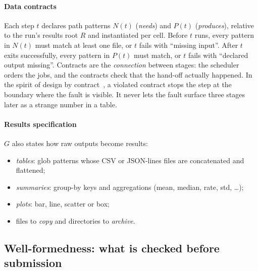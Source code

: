 \documentclass[pdflatex,sn-mathphys-num]{sn-jnl}
\theoremstyle{thmstyleone}%
\theoremstyle{thmstyletwo}%
\theoremstyle{thmstylethree}%
\begin{document}
\paragraph{Data contracts} Each step $t$ declares path patterns
$N(t)$ (\emph{needs}) and $P(t)$ (\emph{produces}), relative to the run's
results root $R$ and instantiated per cell. Before $t$ runs, every pattern in
$N(t)$ must match at least one file, or $t$ fails with ``missing input''. After
$t$ exits successfully, every pattern in $P(t)$ must match, or $t$ fails with
``declared output missing''. Contracts are the \emph{connection} between stages:
the scheduler orders the jobs, and the contracts check that the hand-off
actually happened. In the spirit of design by contract~\cite{meyer1992dbc}, a
violated contract stops the step at the boundary where the fault is visible.
It never lets the fault surface three stages later as a strange number in a
table.

\paragraph{Results specification} $G$ also states how raw outputs become
results:
\begin{itemize}[leftmargin=1.4em, itemsep=1pt]
\item \emph{tables}: glob patterns whose CSV or JSON-lines files are
concatenated and flattened;
\item \emph{summaries}: group-by keys and aggregations (mean, median, rate,
std, \dots);
\item \emph{plots}: bar, line, scatter or box;
\item files to \emph{copy} and directories to \emph{archive}.
\end{itemize}

\subsection{Well-formedness: what is checked before submission}\label{sec:validate}
\end{document}
